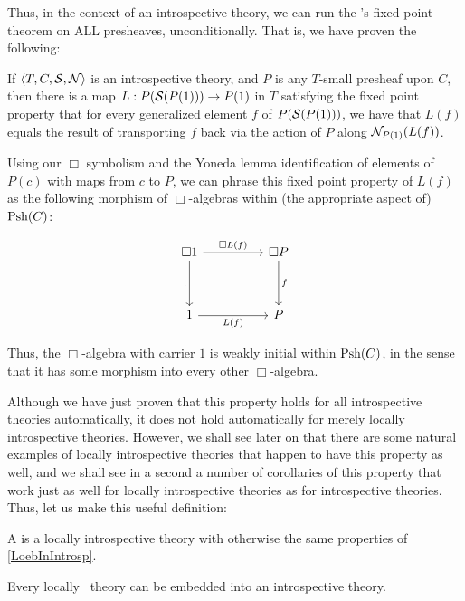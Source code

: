Thus, in the context of an introspective theory, we can run the \Loeb's fixed point theorem on ALL presheaves, unconditionally. That is, we have proven the following:

\label{LoebInIntrosp}
If $\langle T, C, \mathcal{S}, \mathcal{N} \rangle$ is an introspective theory, and $P$ is any $T$-small presheaf upon $C$, then there is a map $L : P(\mathcal{S}(P(1))) \to P(1)$ in $T$ satisfying the fixed point property that for every generalized element $f$ of $P(\mathcal{S}(P(1)))$, we have that $L(f)$ equals the result of transporting $f$ back via the action of $P$ along $\mathcal{N}_{P(1)}(L(f))$.

Using our $\Box$ symbolism and the Yoneda lemma identification of elements of $P(c)$ with maps from $c$ to $P$, we can phrase this fixed point property of $L(f)$ as the following morphism of $\Box$-algebras within (the appropriate aspect of) $\operatorname{Psh}(C)$:

\[\begin{tikzcd}
	{\Box 1} && {\Box P} \\
	\\
	1 && P
	\arrow["f", from=1-3, to=3-3]
	\arrow["{!}"', from=1-1, to=3-1]
	\arrow["{\Box L(f)}", from=1-1, to=1-3]
	\arrow["{L(f)}"', from=3-1, to=3-3]
\end{tikzcd}\]

Thus, the $\Box$-algebra with carrier $1$ is weakly initial within $\operatorname{Psh}(C)$, in the sense that it has some morphism into every other $\Box$-algebra.

Although we have just proven that this property holds for all introspective theories automatically, it does not hold automatically for merely locally introspective theories. However, we shall see later on that there are some natural examples of locally introspective theories that happen to have this property as well, and we shall see in a second a number of corollaries of this property that work just as well for locally introspective theories as for introspective theories. Thus, let us make this useful definition:

\begin{definition}
A  is a locally introspective theory with otherwise the same properties of \cref{LoebInIntrosp}.
\end{definition}

\begin{conjecture}
Every locally \Loeb\ theory can be embedded into an introspective theory.
\end{conjecture}


